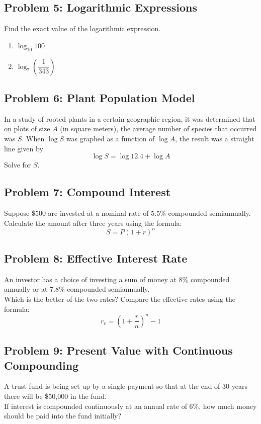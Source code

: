 \documentclass[12pt]{article}
\begin{document}
\subsection*{Problem 5: Logarithmic Expressions}
Find the exact value of the logarithmic expression.
\begin{enumerate}[label=(\alph*)]
    \item \( \log_{10} 100 \)
    \item \( \log_{7}\left( \dfrac{1}{343} \right) \)
\end{enumerate}

\subsection*{Problem 6: Plant Population Model}
In a study of rooted plants in a certain geographic region, it was determined that on plots of size \( A \) (in square meters), the average number of species that occurred was \( S \). When \( \log S \) was graphed as a function of \( \log A \), the result was a straight line given by
\[
\log S = \log 12.4 + \log A
\]
Solve for \( S \).

\subsection*{Problem 7: Compound Interest}
Suppose \$500 are invested at a nominal rate of 5.5\% compounded semiannually.\\
Calculate the amount after three years using the formula:
\[
S = P(1 + r)^n
\]

\subsection*{Problem 8: Effective Interest Rate}
An investor has a choice of investing a sum of money at 8\% compounded annually or at 7.8\% compounded semiannually.\\
Which is the better of the two rates? Compare the effective rates using the formula:
\[
r_e = \left(1 + \dfrac{r}{n} \right)^n - 1
\]

\subsection*{Problem 9: Present Value with Continuous Compounding}
A trust fund is being set up by a single payment so that at the end of 30 years there will be \$50{,}000 in the fund.\\
If interest is compounded continuously at an annual rate of 6\%, how much money should be paid into the fund initially?
\end{document}
